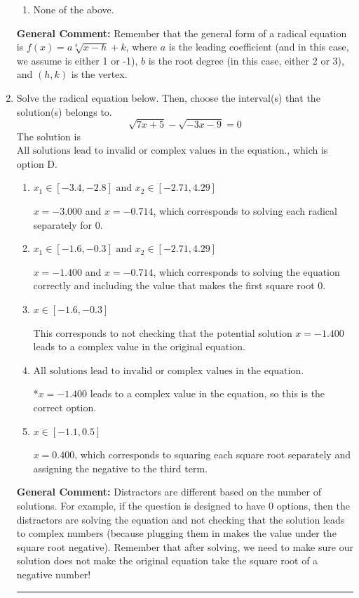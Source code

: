 \documentclass{extbook}[14pt]
\newcommand{\litem}[1]{\item #1

\rule{\textwidth}{0.4pt}}
\begin{document}
\begin{enumerate}
{\begin{enumerate}[label=\Alph*.]
\item None of the above.\end{enumerate}
\textbf{General Comment:} Remember that the general form of a radical equation is $ f(x) = a \sqrt[b]{x - h} + k $, where $a$ is the leading coefficient (and in this case, we assume is either 1 or -1), $b$ is the root degree (in this case, either 2 or 3), and $(h, k)$ is the vertex.
}
\litem{
Solve the radical equation below. Then, choose the interval(s) that the solution(s) belongs to.
\[ \sqrt{7 x + 5} - \sqrt{-3 x - 9} = 0 \]The solution is \( \text{All solutions lead to invalid or complex values in the equation.} \), which is option D.\begin{enumerate}[label=\Alph*.]
\item \( x_1 \in [-3.4, -2.8] \text{ and } x_2 \in [-2.71,4.29] \)

$x = -3.000$ and $x = -0.714$, which corresponds to solving each radical separately for 0.
\item \( x_1 \in [-1.6, -0.3] \text{ and } x_2 \in [-2.71,4.29] \)

$x = -1.400$ and $x = -0.714$, which corresponds to solving the equation correctly and including the value that makes the first square root 0.
\item \( x \in [-1.6,-0.3] \)

This corresponds to not checking that the potential solution $x = -1.400$ leads to a complex value in the original equation.
\item \( \text{All solutions lead to invalid or complex values in the equation.} \)

*$x = -1.400$ leads to a complex value in the equation, so this is the correct option.
\item \( x \in [-1.1,0.5] \)

$x = 0.400$, which corresponds to squaring each square root separately and assigning the negative to the third term.
\end{enumerate}

\textbf{General Comment:} Distractors are different based on the number of solutions. For example, if the question is designed to have 0 options, then the distractors are solving the equation and not checking that the solution leads to complex numbers (because plugging them in makes the value under the square root negative). Remember that after solving, we need to make sure our solution does not make the original equation take the square root of a negative number!
}
\end{enumerate}
\end{document}
